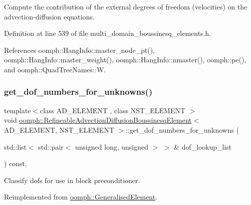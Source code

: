 Compute the contribution of the external degrees of freedom (velocities) on the advection-\/diffusion equations. 



Definition at line 539 of file multi\+\_\+domain\+\_\+boussinesq\+\_\+elements.\+h.



References oomph\+::\+Hang\+Info\+::master\+\_\+node\+\_\+pt(), oomph\+::\+Hang\+Info\+::master\+\_\+weight(), oomph\+::\+Hang\+Info\+::nmaster(), oomph\+::pe(), and oomph\+::\+Quad\+Tree\+Names\+::W.

\mbox{\label{classoomph_1_1RefineableAdvectionDiffusionBoussinesqElement_a9b48b8a752432bce03a4bc51785d0151}} 
\subsubsection{\texorpdfstring{get\+\_\+dof\+\_\+numbers\+\_\+for\+\_\+unknowns()}{get\_dof\_numbers\_for\_unknowns()}}
{\footnotesize\ttfamily template$<$class A\+D\+\_\+\+E\+L\+E\+M\+E\+NT , class N\+S\+T\+\_\+\+E\+L\+E\+M\+E\+NT $>$ \\
void \hyperlink{classoomph_1_1RefineableAdvectionDiffusionBoussinesqElement}{oomph\+::\+Refineable\+Advection\+Diffusion\+Boussinesq\+Element}$<$ A\+D\+\_\+\+E\+L\+E\+M\+E\+NT, N\+S\+T\+\_\+\+E\+L\+E\+M\+E\+NT $>$\+::get\+\_\+dof\+\_\+numbers\+\_\+for\+\_\+unknowns (\begin{DoxyParamCaption}\item[{std\+::list$<$ std\+::pair$<$ unsigned long, unsigned $>$ $>$ \&}]{dof\+\_\+lookup\+\_\+list }\end{DoxyParamCaption}) const\hspace{0.3cm}{\ttfamily [inline]}, {\ttfamily [virtual]}}



Classify dofs for use in block preconditioner. 



Reimplemented from \hyperlink{classoomph_1_1GeneralisedElement_a069f59bfc3e607a5bebba52c6314d777}{oomph\+::\+Generalised\+Element}.



